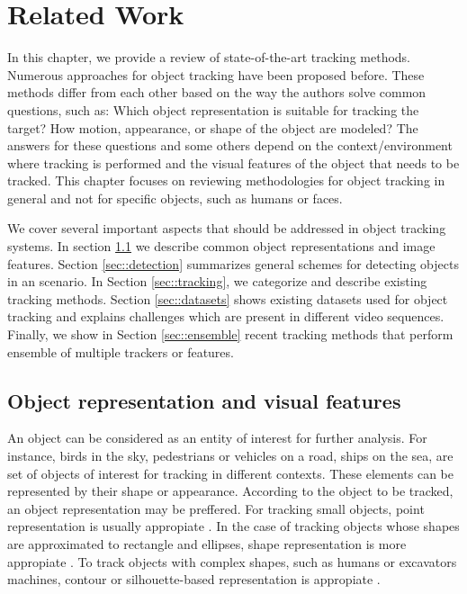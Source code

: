 \chapter{Related Work} %

\label{chapter::related_work} %


In this chapter, we provide a review of state-of-the-art tracking methods.
Numerous approaches for object tracking have been proposed before. These methods
differ from each other based on the way the authors solve common questions, such
as: Which object representation is suitable for tracking the target? How 
motion, appearance, or shape of the object are modeled? The answers 
for these questions and some others depend on the context/environment where tracking is
performed and the visual features of the object that needs to be tracked. This
chapter focuses on reviewing methodologies for object tracking in general
and not for specific objects, such as humans or faces.

We cover several important aspects that should be addressed in object tracking
systems. In section \ref{sec::object_representation} we
describe common object representations and image features. Section
\ref{sec::detection} summarizes general schemes for detecting objects in an
scenario. In Section \ref{sec::tracking}, we categorize and describe
existing tracking methods. Section \ref{sec::datasets} shows existing
datasets used for object tracking and explains challenges which are present
in different video sequences. Finally, we show in Section \ref{sec::ensemble}
recent tracking methods that perform ensemble of multiple trackers or features.

\section{Object representation and visual features}
\label{sec::object_representation}

An object can be considered as an entity of interest for
further analysis. For instance, birds in the sky, pedestrians or vehicles on a
road, ships on the sea, are set of objects of interest for tracking in different
contexts. These elements can be represented by their shape or appearance.
According to the object to be tracked, an object representation
may be preffered. For tracking small objects, point representation is
usually appropiate
\cite{Veenman2001,Shafique2005}. In the case of tracking objects whose shapes
are approximated to rectangle and ellipses, shape representation is more
appropiate \cite{Comaniciu2003a}. To track objects with complex shapes, such
as humans or excavators machines, contour or silhouette-based representation is
appropiate \cite{Haritaoglu2000}.


